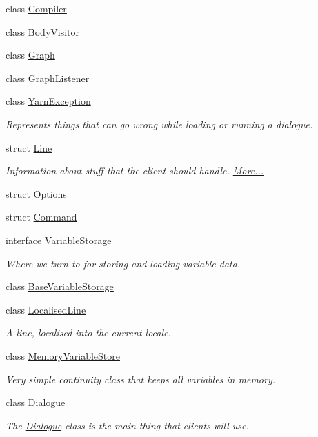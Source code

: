 \begin{DoxyCompactItemize}
\item 
class \hyperlink{a00053}{Compiler}
\item 
class \hyperlink{a00044}{Body\-Visitor}
\item 
class \hyperlink{a00105}{Graph}
\item 
class \hyperlink{a00106}{Graph\-Listener}
\item 
class \hyperlink{a00173}{Yarn\-Exception}
\begin{DoxyCompactList}\small\item\em Represents things that can go wrong while loading or running a dialogue. \end{DoxyCompactList}\item 
struct \hyperlink{a00050_a00352}{Line}
\begin{DoxyCompactList}\small\item\em Information about stuff that the client should handle.  \hyperlink{a00050_a00352}{More...}\end{DoxyCompactList}\item 
struct \hyperlink{a00050_a00355}{Options}
\item 
struct \hyperlink{a00050_a00349}{Command}
\item 
interface \hyperlink{a00169}{Variable\-Storage}
\begin{DoxyCompactList}\small\item\em Where we turn to for storing and loading variable data. \end{DoxyCompactList}\item 
class \hyperlink{a00043}{Base\-Variable\-Storage}
\item 
class \hyperlink{a00128}{Localised\-Line}
\begin{DoxyCompactList}\small\item\em A line, localised into the current locale. \end{DoxyCompactList}\item 
class \hyperlink{a00130}{Memory\-Variable\-Store}
\begin{DoxyCompactList}\small\item\em Very simple continuity class that keeps all variables in memory. \end{DoxyCompactList}\item 
class \hyperlink{a00090}{Dialogue}
\begin{DoxyCompactList}\small\item\em The \hyperlink{a00090}{Dialogue} class is the main thing that clients will use. \end{DoxyCompactList}\item 

\end{DoxyCompactItemize}
